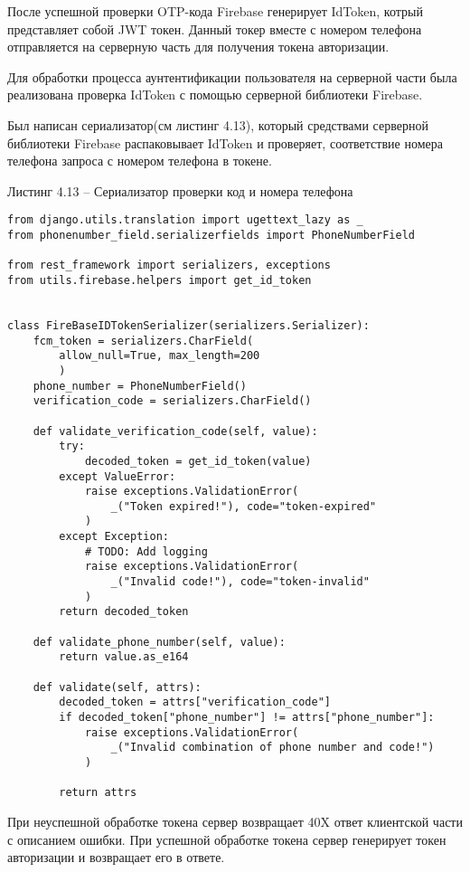 После успешной проверки OTP-кода Firebase генерирует IdToken, котрый представляет собой JWT токен.
Данный токер вместе с номером телефона отправляется на серверную часть для получения токена авторизации.

Для обработки процесса аунтентификации пользователя на серверной части была реализована проверка IdToken с помощью серверной библиотеки Firebase.


Был написан сериализатор(см листинг 4.13), который средствами серверной библиотеки Firebase распаковывает IdToken и проверяет, соответствие номера телефона запроса с номером телефона в токене.

Листинг 4.13 – Сериализатор проверки код и номера телефона
\begin{lstlisting}
from django.utils.translation import ugettext_lazy as _
from phonenumber_field.serializerfields import PhoneNumberField

from rest_framework import serializers, exceptions
from utils.firebase.helpers import get_id_token


class FireBaseIDTokenSerializer(serializers.Serializer):
    fcm_token = serializers.CharField(
        allow_null=True, max_length=200
        )
    phone_number = PhoneNumberField()
    verification_code = serializers.CharField()

    def validate_verification_code(self, value):
        try:
            decoded_token = get_id_token(value)
        except ValueError:
            raise exceptions.ValidationError(
                _("Token expired!"), code="token-expired"
            )
        except Exception:
            # TODO: Add logging
            raise exceptions.ValidationError(
                _("Invalid code!"), code="token-invalid"
            )
        return decoded_token

    def validate_phone_number(self, value):
        return value.as_e164

    def validate(self, attrs):
        decoded_token = attrs["verification_code"]
        if decoded_token["phone_number"] != attrs["phone_number"]:
            raise exceptions.ValidationError(
                _("Invalid combination of phone number and code!")
            )

        return attrs

\end{lstlisting}

При неуспешной обработке токена сервер возвращает 40X ответ клиентской части с описанием ошибки.
При успешной обработке токена сервер генерирует токен авторизации и возвращает его в ответе.

